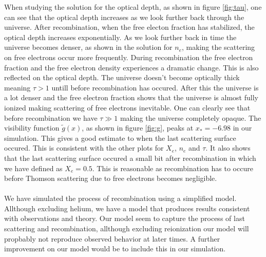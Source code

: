 \documentclass[onecolumn]{aastex62}
\begin{document}
When studying the solution for the optical depth, as shown in figure \ref{fig:tau}, one can see that the optical depth increases as we look further back through the universe. After recombination, when the free electon fraction has stabilized, the optical depth increases exponentially. As we look further back in time the universe becomes denser, as shown in the solution for $n_e$, making the scattering on free electrons occur more frequently. During recombination the free electron fraction and the free electron density experiences a dramatic change. This is also reflected on the optical depth. The universe doesn't become optically thick meaning $\tau>1$ untill before recombination has occured. After this the universe is a lot denser and the free electron fraction shows that the universe is almost fully ionized making scattering of free electrons inevitable. One can clearly see that before recombination we have $\tau\gg 1$ making the universe completely opaque. The visibility function $\widetilde{g}(x)$, as shown in figure \ref{fig:g}, peaks at $x_*=-6.98$ in our simulation. This gives a good estimate to when the last scattering surface occured. This is consistent with the other plots for $X_e$, $n_e$ and $\tau$. It also shows that the last scattering surface occured a small bit after recombination in which we have defined as $X_e=0.5$. This is reasonable as recombination has to occure before Thomson scattering due to free electrons becomes negligible. \\\\\indent
We have simulated the process of recombination using a simplified model. Allthough excluding helium, we have a model that produces results consistent with observations and theory. Our model seem to capture the process of last scattering and recombination, allthough excluding reionization our model will propbably not reproduce observed behavior at later times. A further improvement on our model would be to include this in our simulation.






\end{document}
